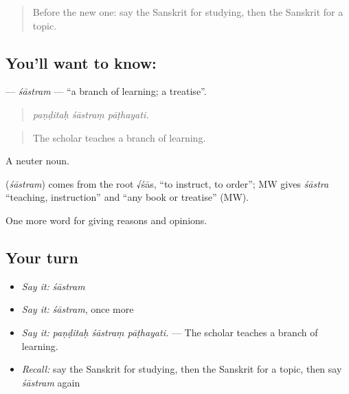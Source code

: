\label{lesson:SA-C363-sastram}



\begin{quote}
Before the new one: say the Sanskrit for studying, then the Sanskrit for a topic.
\end{quote}

\subsection*{You'll want to know: }
\textbf{} — \emph{śāstram} — \textquotedblleft{}a branch of learning; a treatise\textquotedblright{}.

\begin{quote}
  
\end{quote}

\begin{quote}
\emph{paṇḍitaḥ śāstraṃ pāṭhayati.}
\end{quote}

\begin{quote}
The scholar teaches a branch of learning.
\end{quote}

A neuter noun.

\begin{cousinweb}
\textbf{} (\emph{śāstram}) comes from the root √śās, \textquotedblleft{}to instruct, to order\textquotedblright{}; MW gives \emph{śāstra} \textquotedblleft{}teaching, instruction\textquotedblright{} and \textquotedblleft{}any book or treatise\textquotedblright{} (MW).
\end{cousinweb}

\begin{grammarlens}[title={What you've built}]
One more word for giving reasons and opinions.
\end{grammarlens}

\subsection*{Your turn}
\begin{itemize}
\raggedright
  \item \emph{Say it:} \emph{śāstram}
  \item \emph{Say it:} \emph{śāstram}, once more
  \item \emph{Say it:} \emph{paṇḍitaḥ śāstraṃ pāṭhayati.} — The scholar teaches a branch of learning.
  \item \emph{Recall:} say the Sanskrit for studying, then the Sanskrit for a topic, then say \emph{śāstram} again
\end{itemize}

